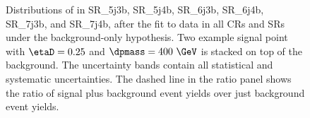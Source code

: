 \begin{figure}[btp]
  \caption{Distributions of \dave in \protect{} SR\_5j3b, \protect{} SR\_5j4b, \protect{} SR\_6j3b, \protect{} SR\_6j4b, \protect{} SR\_7j3b, and \protect{} SR\_7j4b, after the fit to data in all CRs and SRs under the background-only hypothesis.
  Two example \sul signal point with $\etaD=0.25$ and $\dpmass=400~\GeV$ is stacked on top of the background. The uncertainty bands contain all statistical and systematic uncertainties. The dashed line in the ratio panel shows the ratio of signal plus background event yields over just background event yields.}
  \label{fig:1lep_postfit_SR}
\end{figure}

